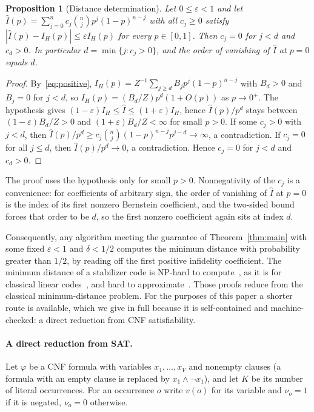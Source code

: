 \documentclass[11pt]{article}
\newtheorem{proposition}[theorem]{Proposition}
\theoremstyle{remark}
\newcommand{\eps}{\varepsilon}
\newcommand{\Bern}[2]{\binom{#1}{#2}p^{#2}(1-p)^{#1-#2}}
\begin{document}
\begin{proposition}[Distance determination]\label{prop:distance}
Let \(0\le\eps<1\) and let \(\widehat I(p)=\sum_{j=0}^nc_j\Bern{n}{j}\)
with all \(c_j\ge0\) satisfy \(|\widehat I(p)-I_H(p)|\le\eps I_H(p)\)
for every \(p\in[0,1]\). Then \(c_j=0\) for \(j<d\) and \(c_d>0\).
In particular \(d=\min\{j:c_j>0\}\), and the order of vanishing of
\(\widehat I\) at \(p=0\) equals \(d\).
\end{proposition}
\begin{proof}
By~\eqref{eq:positive}, \(I_H(p)=Z^{-1}\sum_{j\ge d}B_jp^j(1-p)^{n-j}\)
with \(B_d>0\) and \(B_j=0\) for \(j<d\), so
\(I_H(p)=(B_d/Z)p^d(1+O(p))\) as \(p\to0^+\). The hypothesis gives
\((1-\eps)I_H\le\widehat I\le(1+\eps)I_H\), hence
\(\widehat I(p)/p^d\) stays between \((1-\eps)B_d/Z>0\) and
\((1+\eps)B_d/Z<\infty\) for small \(p>0\). If some \(c_j>0\) with
\(j<d\), then \(\widehat I(p)/p^d\ge c_j\binom nj(1-p)^{n-j}p^{j-d}\to\infty\),
a contradiction. If \(c_j=0\) for all \(j\le d\), then
\(\widehat I(p)/p^d\to0\), a contradiction. Hence \(c_j=0\) for \(j<d\)
and \(c_d>0\).
\end{proof}

The proof uses the hypothesis only for small \(p>0\). Nonnegativity of
the \(c_j\) is a convenience: for coefficients of arbitrary sign, the
order of vanishing of \(\widehat I\) at \(p=0\) is the index of its
first nonzero Bernstein coefficient, and the two-sided bound forces
that order to be \(d\), so the first nonzero coefficient again sits at
index \(d\).

Consequently, any algorithm meeting the guarantee of
Theorem~\ref{thm:main} with some fixed \(\eps<1\) and \(\delta<1/2\)
computes the minimum distance with probability greater than \(1/2\), by
reading off the first positive infidelity coefficient. The minimum
distance of a stabilizer code is NP-hard to
compute~\cite{kapshikarkundu2023}, as it is for classical linear
codes~\cite{vardy1997,bmvt1978}, and hard to
approximate~\cite{gjs2025,kapshikar2026}. Those proofs reduce from the
classical minimum-distance problem. For the purposes of this paper a
shorter route is available, which we give in full because it is
self-contained and machine-checked: a direct reduction from CNF
satisfiability.

\paragraph{A direct reduction from SAT.}
Let \(\varphi\) be a CNF formula with variables \(x_1,\dots,x_V\) and
nonempty clauses (a formula with an empty clause is replaced by
\(x_1\wedge\neg x_1\)), and let \(K\) be its number of literal
occurrences. For an occurrence \(o\) write \(v(o)\) for its variable and
\(\nu_o=1\) if it is negated, \(\nu_o=0\) otherwise.
\end{document}
